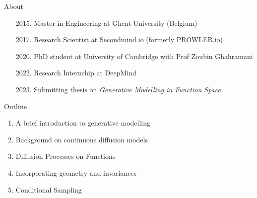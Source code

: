 \begin{frame}{About}
\begin{center}
\begin{minipage}[c]{0.9\linewidth}
\begin{enumerate}
    \item[2015.] Master in Engineering at Ghent University (Belgium)
    \item[2017.] Research Scientist at Secondmind.io (formerly PROWLER.io)
    \item[2020.] PhD student at University of Cambridge with Prof Zoubin Ghahramani
    \item[2022.] Research Internship at DeepMind
    \item[2023.] Submitting thesis on \emph{Generative Modelling in Function Space}
\end{enumerate}
\end{minipage}
\end{center}
\end{frame}

\begin{frame}{Outline}
\begin{enumerate}
    \item A brief introduction to generative modelling
    \item Background on continuous diffusion models
    \item Diffusion Processes on Functions
    \item Incorporating geometry and invariances
    \item Conditional Sampling
\end{enumerate}
\end{frame}


